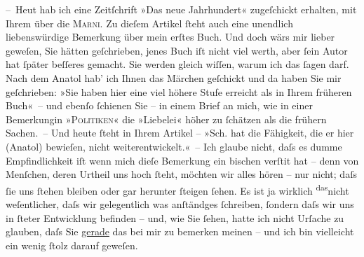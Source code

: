 \pstart
           – Heut hab ich eine Zeitſchrift »Das neue
                  Jahrhundert« zugeſchickt erhalten, mit Ihrem \label{K_L00848-1v}\label{K_L00848-1} über die \textsc{Marni}. {\pb}Zu dieſem Artikel ſteht auch eine unendlich
               liebenswürdige Bemerkung über mein erſtes Buch. Und doch wärs mir lieber geweſen, Sie hätten
               geſchrieben, jenes Buch iſt nicht viel werth, aber ſein Autor hat ſpäter beſſeres
               gemacht. Sie werden gleich wiſſen, warum ich das ſagen darf. Nach dem Anatol hab’ ich Ihnen das Märchen geſchickt und da haben Sie mir geſchrieben: »Sie haben
               hier eine viel höhere Stufe erreicht als in Ihrem früheren Buch« – und ebenſo ſchienen Sie – in einem
               Brief an mich, wie in einer Bemerkungin »\textsc{Politiken}« die »Liebelei« höher zu ſchätzen als die
               frühern Sachen. – Und heute ſteht in Ihrem Artikel – »Sch. hat die Fähigkeit, die er hier \introOben{}(Anatol)\introOben{} bewieſen, nicht weiterentwickelt.« – Ich glaube nicht, daſs es dumme
               Empfindlichkeit iſt wenn mich dieſe Bemerkung ein bischen verſti{\geminationm}t hat – denn von Menſchen, deren Urtheil uns hoch
               ſteht, möchten wir alles hören – nur nicht; daſs ſie uns ſtehen bleiben oder gar
               herunter ſteigen ſehen. Es ist ja wirklich \substVorne{}\textsuperscript{das}\substDazwischen{}nicht\substHinten{} weſentlicher, daſs wir gelegentlich was anſtändges ſchreiben, ſondern {\pb}daſs wir uns in ſteter Entwicklung befinden – und, wie
               Sie ſehen, hatte ich nicht Urſache zu glauben, daſs Sie \uline{gerade} das bei mir zu bemerken meinen – und ich bin vielleicht ein wenig
               ſtolz darauf geweſen.\pend
           
